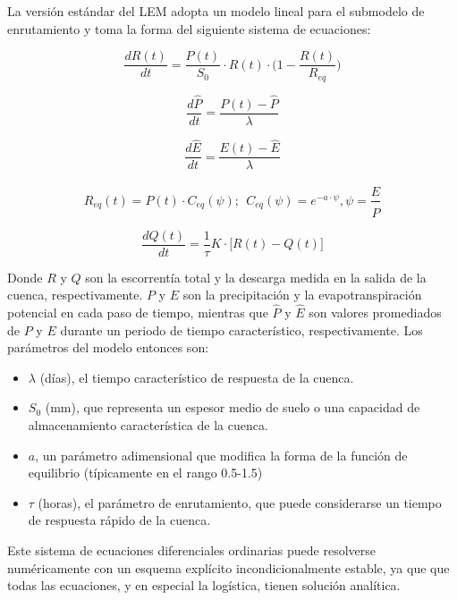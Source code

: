 La versión estándar del LEM adopta un modelo lineal para el submodelo de enrutamiento y toma la forma del siguiente sistema 
de ecuaciones:


\begin{equation}
    \frac{d R(t)}{dt}=\frac{P(t)}{S_0}\cdot R(t)\cdot\big(1-\frac{R(t)}{R_{eq}}\big)
\end{equation}

\begin{equation}
    \frac{d \hat{P}}{dt}=\frac{P(t)-\hat{P}}{\lambda}
\end{equation}


\begin{equation}
    \frac{d \hat{E}}{dt}=\frac{E(t)-\hat{E}}{\lambda}
\end{equation}


\begin{equation}
    R_{eq}(t)=P(t)\cdot C_{eq}(\psi);\ \ C_{eq}(\psi)=e^{-a\cdot \psi}, \psi=\frac{\hat{E}}{\hat{P}}
\end{equation}


\begin{equation}
    \frac{d Q(t)}{dt}=\frac{1}{\tau}K\cdot \big[R(t)-Q(t)\big]
\end{equation}


Donde $R$ y $Q$ son la escorrentía total y la descarga medida en la salida de la cuenca, respectivamente. 
$P$ y $E$ son la precipitación y la evapotranspiración potencial en cada paso de tiempo, mientras que $\hat{P}$ y $\hat{E}$ 
son valores promediados de $P$ y $E$ durante un periodo de tiempo característico, respectivamente. 
Los parámetros del modelo entonces son:
\begin{itemize}
    \item $\lambda$ (días), el tiempo característico de respuesta  de la cuenca. %
    \item $S_0$ (mm), que representa un espesor medio de suelo o una capacidad de almacenamiento característica de la cuenca.
    \item $a$, un parámetro adimensional que modifica la forma de la función de equilibrio (típicamente en el rango 0.5-1.5)
    \item $\tau$ (horas), el parámetro de enrutamiento, que puede considerarse un tiempo 
    de respuesta rápido de la cuenca.
\end{itemize}
Este sistema de ecuaciones diferenciales ordinarias puede resolverse numéricamente con un esquema explícito 
incondicionalmente estable, ya que  que todas las ecuaciones, y en especial la logística, tienen solución analítica.

